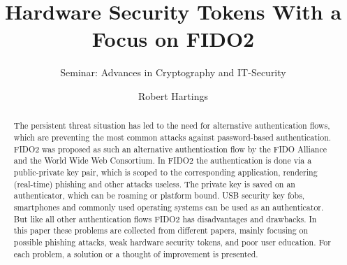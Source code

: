 \documentclass[runningheads]{llncs}
\begin{document}
%
\title{Hardware Security Tokens With a Focus on FIDO2}
\subtitle{Seminar: Advances in Cryptography and IT-Security}
%
%

\author{Robert Hartings}

%
\maketitle              %
\begin{abstract}
The persistent threat situation has led to the need for alternative authentication flows, which are preventing the most common attacks against password-based authentication. FIDO2 was proposed as such an alternative authentication flow by the FIDO Alliance and the World Wide Web Consortium. In FIDO2 the authentication is done via a public-private key pair, which is scoped to the corresponding application, rendering (real-time) phishing and other attacks useless. The private key is saved on an authenticator, which can be roaming or platform bound. USB security key fobs, smartphones and commonly used operating systems can be used as an authenticator. But like all other authentication flows FIDO2 has disadvantages and drawbacks. In this paper these problems are collected from different papers, mainly focusing on possible phishing attacks, weak hardware security tokens, and poor user education. For each problem, a solution or a thought of improvement is presented.

\end{abstract}
%
%
%
\end{document}
